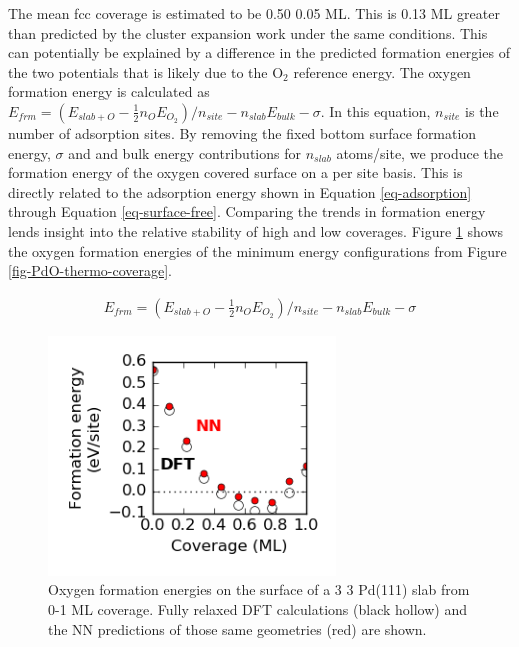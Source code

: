 \documentclass[12pt]{cmuthesis}
\begin{document}
The mean fcc coverage is estimated to be 0.50 \textpm{} 0.05 ML. This is 0.13 ML greater than predicted by the cluster expansion work under the same conditions. This can potentially be explained by a difference in the predicted formation energies of the two potentials that is likely due to the O\(_{\text{2}}\) reference energy. The oxygen formation energy is calculated as \(E_{frm} = (E_{slab+O} - \frac{1}{2} n_{O} E_{O_{2}})/n_{site} - n_{slab} E_{bulk} - \sigma\). In this equation, \(n_{site}\) is the number of adsorption sites. By removing the fixed bottom surface formation energy, \(\sigma\) and and bulk energy contributions for \(n_{slab}\) atoms/site, we produce the formation energy of the oxygen covered surface on a per site basis. This is directly related to the adsorption energy shown in Equation \ref{eq-adsorption} through Equation \ref{eq-surface-free}. Comparing the trends in formation energy lends insight into the relative stability of high and low coverages. Figure \ref{fig-formation-energy} shows the oxygen formation energies of the minimum energy configurations from Figure \ref{fig-PdO-thermo-coverage}.

\begin{eqnarray} \label{eq-formation}
E_{frm} = (E_{slab+O} - \frac{1}{2} n_{O} E_{O_{2}})/n_{site} - n_{slab} E_{bulk} - \sigma
\end{eqnarray}

\begin{figure}[htbp]
\centering
\includegraphics[width=3in]{./images/formation-energy.png}
\caption{\label{fig-formation-energy}
Oxygen formation energies on the surface of a 3 \texttimes{} 3 Pd(111) slab from 0-1 ML coverage. Fully relaxed DFT calculations (black hollow) and the NN predictions of those same geometries (red) are shown.}
\end{figure}
\end{document}
